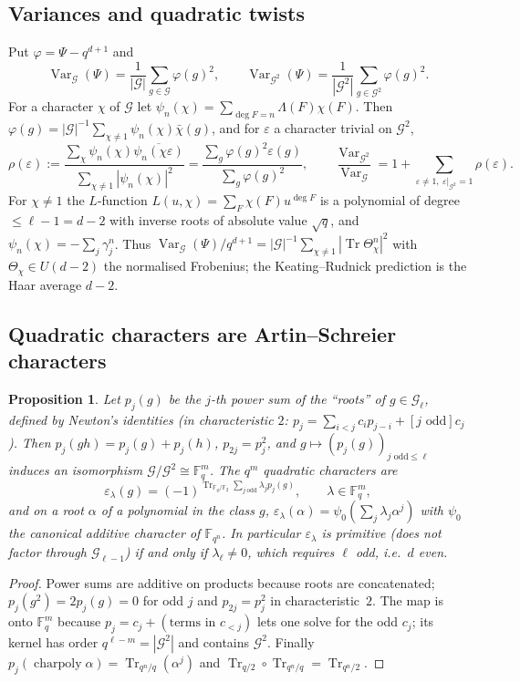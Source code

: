 \documentclass[11pt,a4paper]{amsart}
\newtheorem{proposition}[theorem]{Proposition}
\theoremstyle{definition}
\newcommand{\F}{\mathbb{F}}
\newcommand{\G}{\mathcal{G}}
\newcommand{\Tr}{\operatorname{Tr}}
\newcommand{\Var}{\operatorname{Var}}
\newcommand{\charpoly}{\operatorname{charpoly}}
\newcommand{\eps}{\varepsilon}
\begin{document}
\subsection{Variances and quadratic twists}
Put $\varphi=\Psi-q^{d+1}$ and
\[
\Var_\G(\Psi)=\frac1{|\G|}\sum_{g\in\G}\varphi(g)^2,\qquad \Var_{\G^2}(\Psi)=\frac1{|\G^2|}\sum_{g\in\G^2}\varphi(g)^2 .
\]
For a character $\chi$ of $\G$ let $\psi_n(\chi)=\sum_{\deg F=n}\Lambda(F)\chi(F)$. Then $\varphi(g)=|\G|^{-1}\sum_{\chi\ne1}\psi_n(\chi)\bar\chi(g)$, and for $\eps$ a character trivial on $\G^2$,
\begin{equation}\label{eq:rho}
\rho(\eps):=\frac{\sum_{\chi}\psi_n(\chi)\overline{\psi_n(\chi\eps)}}{\sum_{\chi\ne1}|\psi_n(\chi)|^2}=\frac{\sum_g\varphi(g)^2\eps(g)}{\sum_g\varphi(g)^2},\qquad
\frac{\Var_{\G^2}}{\Var_\G}=1+\sum_{\eps\ne1,\ \eps|_{\G^2}=1}\rho(\eps).
\end{equation}
For $\chi\ne1$ the $L$-function $L(u,\chi)=\sum_F\chi(F)u^{\deg F}$ is a polynomial of degree $\le\ell-1=d-2$ with inverse roots of absolute value $\sqrt q$, and $\psi_n(\chi)=-\sum_j\gamma_j^n$. Thus $\Var_\G(\Psi)/q^{d+1}=|\G|^{-1}\sum_{\chi\ne1}|\Tr\Theta_\chi^n|^2$ with $\Theta_\chi\in U(d-2)$ the normalised Frobenius; the Keating--Rudnick prediction is the Haar average $d-2$.

\subsection{Quadratic characters are Artin--Schreier characters}
\begin{proposition}\label{prop:quadchar}
Let $p_j(g)$ be the $j$-th power sum of the ``roots'' of $g\in\G_\ell$, defined by Newton's identities (in characteristic $2$: $p_j=\sum_{i<j}c_ip_{j-i}+[j\text{ odd}]c_j$). Then $p_j(gh)=p_j(g)+p_j(h)$, $p_{2j}=p_j^2$, and $g\mapsto(p_j(g))_{j\text{ odd}\le\ell}$ induces an isomorphism $\G/\G^2\cong\F_q^m$. The $q^m$ quadratic characters are
\[
\eps_\lambda(g)=(-1)^{\Tr_{\F_q/\F_2}\sum_{j\ \mathrm{odd}}\lambda_jp_j(g)},\qquad\lambda\in\F_q^m,
\]
and on a root $\alpha$ of a polynomial in the class $g$, $\eps_\lambda(\alpha)=\psi_0(\sum_j\lambda_j\alpha^j)$ with $\psi_0$ the canonical additive character of $\F_{q^n}$. In particular $\eps_\lambda$ is primitive (does not factor through $\G_{\ell-1}$) if and only if $\lambda_\ell\ne0$, which requires $\ell$ odd, i.e.\ $d$ even.
\end{proposition}
\begin{proof}
Power sums are additive on products because roots are concatenated; $p_j(g^2)=2p_j(g)=0$ for odd $j$ and $p_{2j}=p_j^2$ in characteristic~$2$. The map is onto $\F_q^m$ because $p_j=c_j+(\text{terms in }c_{<j})$ lets one solve for the odd $c_j$; its kernel has order $q^{\ell-m}=|\G^2|$ and contains $\G^2$. Finally $p_j(\charpoly\alpha)=\Tr_{q^n/q}(\alpha^j)$ and $\Tr_{q/2}\circ\Tr_{q^n/q}=\Tr_{q^n/2}$.
\end{proof}
\end{document}

